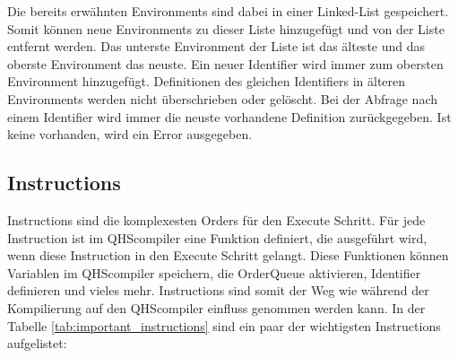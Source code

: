 Die bereits erwähnten Environments sind dabei in einer Linked-List gespeichert. Somit können neue Environments zu dieser Liste hinzugefügt und von der Liste entfernt werden.
Das unterste Environment der Liste ist das älteste und das oberste Environment das neuste.
Ein neuer Identifier wird immer zum obersten Environment hinzugefügt. Definitionen des gleichen Identifiers in älteren Environments werden nicht überschrieben oder gelöscht.
Bei der Abfrage nach einem Identifier wird immer die neuste vorhandene Definition zurückgegeben. Ist keine vorhanden, wird ein Error ausgegeben.

\subsection{Instructions}
Instructions sind die komplexesten Orders für den Execute Schritt. Für jede Instruction ist im QHScompiler eine Funktion definiert, die ausgeführt wird, wenn diese Instruction in den Execute Schritt gelangt.
Diese Funktionen können Variablen im QHScompiler speichern, die OrderQueue aktivieren, Identifier definieren und vieles mehr. Instructions sind somit der Weg wie während der Kompilierung auf den QHScompiler einfluss genommen werden kann.
In der Tabelle \ref{tab:important_instructions} sind ein paar der wichtigsten Instructions aufgelistet:

